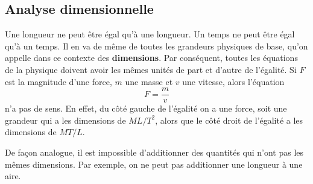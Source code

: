 

\subsection{Analyse dimensionnelle}

Une longueur ne peut être égal qu'à une longueur.  Un temps ne peut être égal
qu'à un temps.  Il en va de même de toutes les grandeurs physiques de base,
qu'on appelle dans ce contexte des \textbf{dimensions}.  Par conséquent, toutes
les équations de la physique doivent avoir les mêmes unités de part et d'autre
de l'égalité.  Si $F$ est la magnitude d'une force, $m$ une masse et $v$ une
vitesse, alors l'équation
\[
  F = \frac{m}{v} 
\]
n'a pas de sens.  En effet, du côté gauche de l'égalité on a une force, soit
une grandeur qui a les dimensions de $ML/T^2$, alors que le côté droit de
l'égalité a les dimensions de $MT/L$.

De façon analogue, il est impossible d'additionner des quantités qui n'ont pas
les mêmes dimensions.  Par exemple, on ne peut pas additionner une longueur à
une aire.

